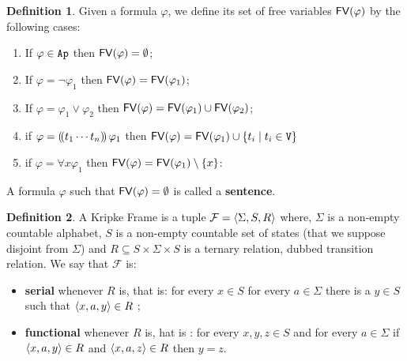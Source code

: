 \documentclass{article}
\theoremstyle{definition}
\newtheorem{definition}{Definition}[section]
\begin{document}
\begin{definition}
      Given a formula $\varphi$, we define its set of free variables  $\mathsf{FV}(\varphi)  $ by the following cases: 

    \begin{enumerate}
        
        \item If $\varphi\in \texttt{Ap}$ then $\mathsf{FV}(\varphi)=\emptyset$; 
        \item If $\varphi=\neg \varphi_1$ then $\mathsf{FV}(\varphi)=\mathsf{FV}(\varphi_1)$; 
        \item If $\varphi=\varphi_1 \vee \varphi_2$ then $\mathsf{FV}(\varphi)=\mathsf{FV}(\varphi_1)\cup \mathsf{FV}(\varphi_2)$; 
        \item if $\varphi=(\!( t_1\cdots t_n  )\!)\,\varphi_1$ then 
       $\mathsf{FV}(\varphi)=\mathsf{FV}(\varphi_1)\cup \{t_i \mid t_i\in \texttt{V}\} $
        
     \item if $\varphi= \forall x \varphi_1$ then $\mathsf{FV}(\varphi)=\mathsf{FV}(\varphi_1)\setminus \{x\}$:
       
        
    \end{enumerate}

    \noindent A formula $\varphi$ such that $\mathsf{FV}(\varphi)=\emptyset$ is called a \textbf{sentence}.
\end{definition}



\begin{definition}
    A Kripke Frame is a tuple $\mathcal{F}=\langle \Sigma,S,R \rangle$ where, $\Sigma$ is a non-empty countable alphabet, $S$ is a non-empty countable set of states  (that we suppose disjoint from $\Sigma$) and  $R\subseteq S\times \Sigma \times S$ is a ternary relation, dubbed transition relation. We say that $\mathcal{F}$ is: 
    \begin{itemize}
        \item[] \textbf{serial} whenever $R$ is, that is: for every $x\in S$ for every $a\in \Sigma$ there is a  $y\in S$ such that $\langle x,a,y \rangle\in R$ ; 
        \item[]\textbf{functional} whenever $R$ is, hat is : for every $x,y,z\in S$ and for every $a\in \Sigma$ if $\langle x,a,y \rangle\in R$ and $\langle x,a,z \rangle\in R$ then $y=z$. 
      \end{itemize}


\end{definition}
\end{document}
